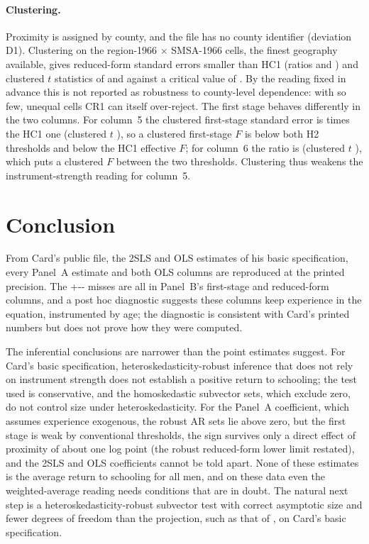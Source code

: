 \documentclass[11pt]{article}
\newcommand{\HOneMisses}{\the\numexpr\HOnePrimaryTargets+\HOneSecondaryTargets-\HOnePrimaryReproduced-\HOneSecondaryReproduced\relax}
\begin{document}
\paragraph{Clustering.} Proximity is assigned by county, and the file has no county
identifier (deviation D1). Clustering on the \NClusters{} region-1966 $\times$ SMSA-1966
cells, the finest geography available, gives reduced-form standard errors smaller than HC1
(ratios \ASixRfClRatio{} and \AFiveRfClRatio{}) and clustered $t$ statistics of
\ASixRfTCl{} and \AFiveRfTCl{} against a critical value of \TCritCl{}. By the reading fixed in
advance this is not reported as robustness to county-level dependence: with so few,
unequal cells CR1 can itself over-reject. The first stage behaves differently in the two
columns. For column~5 the clustered first-stage standard error is \AFiveFsClRatio{} times
the HC1 one (clustered $t$ \AFiveFsTCl{}), so a clustered first-stage $F$ is below both H2
thresholds and below the HC1 effective $F$; for column~6 the ratio is \ASixFsClRatio{}
(clustered $t$ \ASixFsTCl{}), which puts a clustered $F$ between the two thresholds. Clustering
thus weakens the instrument-strength reading for column~5.

\section{Conclusion}
\label{sec:conclusion}

From Card's public file, the 2SLS and OLS estimates of his basic specification, every
Panel~A estimate and both OLS columns are reproduced at the printed precision. The \HOneMisses{}
misses are all in Panel~B's first-stage and reduced-form columns, and a post hoc diagnostic
suggests these columns keep experience in the equation, instrumented by age; the
diagnostic is consistent with Card's printed numbers but does not prove how they were
computed.

The inferential conclusions are narrower than the point estimates suggest. For Card's basic
specification, heteroskedasticity-robust inference that does not rely on instrument strength
does not establish a positive return to schooling; the test used is conservative, and the
homoskedastic subvector sets, which exclude zero, do not control size under
heteroskedasticity. For the Panel~A coefficient, which assumes experience exogenous, the
robust AR sets lie above zero, but the first stage is weak by conventional thresholds, the
sign survives only a direct effect of proximity of about one log point (the robust
reduced-form lower limit restated), and the 2SLS and OLS coefficients cannot be told apart.
None of these estimates is the average return to schooling for all men, and on these data
even the weighted-average reading needs conditions that are in doubt. The natural next step
is a heteroskedasticity-robust subvector test with correct asymptotic size and fewer
degrees of freedom than the projection, such as that of \citet{guggenberger2024powerful}, on Card's basic specification.
\end{document}
